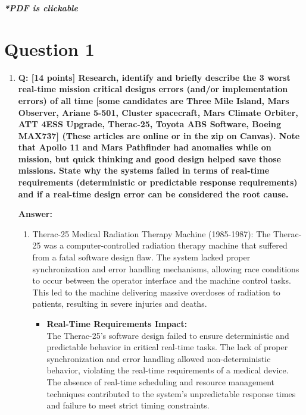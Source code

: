 \documentclass[a4paper,11pt]{article}%
\newenvironment{qanda}{\setlength{\parindent}{0pt}}{\bigskip}
\newcommand{\Q}{\bigskip\bfseries Q: }
\newcommand{\A}{\par\textbf{Answer: } \normalfont}
\begin{document}



\pagebreak

\tableofcontents
\listoffigures
\listoftables
\vfill
\begin{center}
	\textbf{\textit{*PDF is clickable}}
\end{center}

\pagebreak
\begin{qanda}
	\section{Question 1}
	\begin{enumerate}
		\item[] \Q [14 points] Research, identify and briefly describe the 3 worst real-time mission critical
			designs errors (and/or implementation errors) of all time [some candidates are Three Mile
					Island, Mars Observer, Ariane 5-501, Cluster spacecraft, Mars Climate Orbiter, ATT 4ESS
					Upgrade, Therac-25, Toyota ABS Software, Boeing MAX737] (These articles are online or
			in the zip on Canvas). Note that Apollo 11 and Mars Pathfinder had anomalies while on
			mission, but quick thinking and good design helped save those missions. State why the
			systems failed in terms of real-time requirements (deterministic or predictable response
			requirements) and if a real-time design error can be considered the root cause.
			\A
			\begin{enumerate}
				\item Therac-25 Medical Radiation Therapy Machine (1985-1987): The Therac-25 was a computer-controlled radiation therapy machine that suffered from a fatal software design flaw. The system lacked proper synchronization and error handling mechanisms, allowing race conditions to occur between the operator interface and the machine control tasks. This led to the machine delivering massive overdoses of radiation to patients, resulting in severe injuries and deaths.
				      \begin{itemize}
					      \item \textbf{Real-Time Requirements Impact:}\\
					            The Therac-25's software design failed to ensure deterministic and predictable behavior in critical real-time tasks. The lack of proper synchronization and error handling allowed non-deterministic behavior, violating the real-time requirements of a medical device. The absence of real-time scheduling and resource management techniques contributed to the system's unpredictable response times and failure to meet strict timing constraints.


\end{itemize}
\end{enumerate}
\end{enumerate}
\end{qanda}
\end{document}

